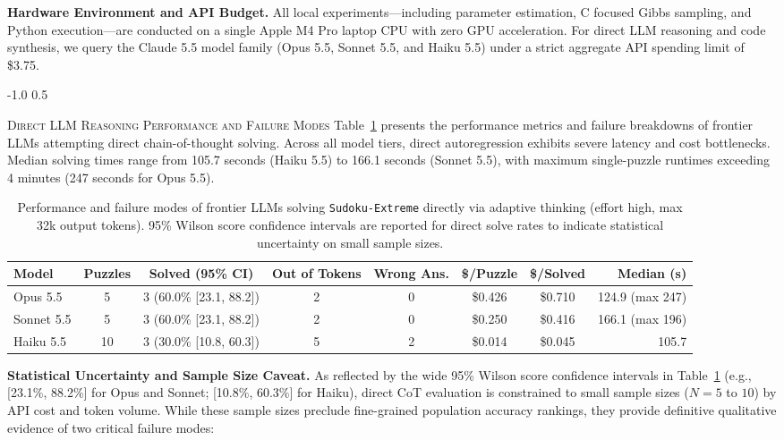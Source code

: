 \documentclass{article} %
\makeatletter
\renewcommand{\subsection}{\@startsection{subsection}{2}{\z@}%
  {-1.0\baselineskip}%
  {0.5\baselineskip}%
  {\normalfont\fontsize{10pt}{12pt}\selectfont\scshape\raggedright}}
\makeatother
\begin{document}
\textbf{Hardware Environment and API Budget.} All local experiments—including parameter estimation, C focused Gibbs sampling, and Python execution—are conducted on a single Apple M4 Pro laptop CPU with zero GPU acceleration. For direct LLM reasoning and code synthesis, we query the Claude 5.5 model family (Opus 5.5, Sonnet 5.5, and Haiku 5.5) under a strict aggregate API spending limit of \$3.75.

\subsection{\textsc{Direct LLM Reasoning Performance and Failure Modes}}
Table~\ref{tab:direct_llm} presents the performance metrics and failure breakdowns of frontier LLMs attempting direct chain-of-thought solving. Across all model tiers, direct autoregression exhibits severe latency and cost bottlenecks. Median solving times range from 105.7 seconds (Haiku 5.5) to 166.1 seconds (Sonnet 5.5), with maximum single-puzzle runtimes exceeding 4 minutes (247 seconds for Opus 5.5).

\begin{table}[t]
\caption{Performance and failure modes of frontier LLMs solving \texttt{Sudoku-Extreme} directly via adaptive thinking (effort high, max 32k output tokens). 95\% Wilson score confidence intervals are reported for direct solve rates to indicate statistical uncertainty on small sample sizes.}
\label{tab:direct_llm}
\begin{center}
\small
\begin{tabular}{lccccccr}
\toprule
\textbf{Model} & \textbf{Puzzles} & \textbf{Solved (95\% CI)} & \textbf{Out of Tokens} & \textbf{Wrong Ans.} & \textbf{\$/Puzzle} & \textbf{\$/Solved} & \textbf{Median (s)} \\
\midrule
Opus 5.5   & 5  & 3 (60.0\% [23.1, 88.2]) & 2 & 0 & \$0.426 & \$0.710 & 124.9 (max 247) \\
Sonnet 5.5 & 5  & 3 (60.0\% [23.1, 88.2]) & 2 & 0 & \$0.250 & \$0.416 & 166.1 (max 196) \\
Haiku 5.5  & 10 & 3 (30.0\% [10.8, 60.3]) & 5 & 2 & \$0.014 & \$0.045 & 105.7 \\
\bottomrule
\end{tabular}
\end{center}
\end{table}

\textbf{Statistical Uncertainty and Sample Size Caveat.} As reflected by the wide 95\% Wilson score confidence intervals in Table~\ref{tab:direct_llm} (e.g., [23.1\%, 88.2\%] for Opus and Sonnet; [10.8\%, 60.3\%] for Haiku), direct CoT evaluation is constrained to small sample sizes ($N=5$ to $10$) by API cost and token volume. While these sample sizes preclude fine-grained population accuracy rankings, they provide definitive qualitative evidence of two critical failure modes:
\end{document}
